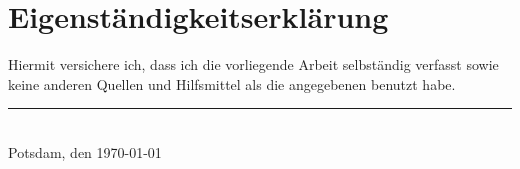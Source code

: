 \chapter*{Eigenständigkeitserklärung}

\thispagestyle{empty}

Hiermit versichere ich, dass ich die vorliegende Arbeit selbständig
verfasst sowie keine anderen Quellen und Hilfsmittel als die angegebenen
benutzt habe.\\[5\baselineskip]

\flushright
\rule{.4\textwidth}{0.4pt}\\[-1mm]
Potsdam, den \today\\
\makeatletter\@author\makeatother

